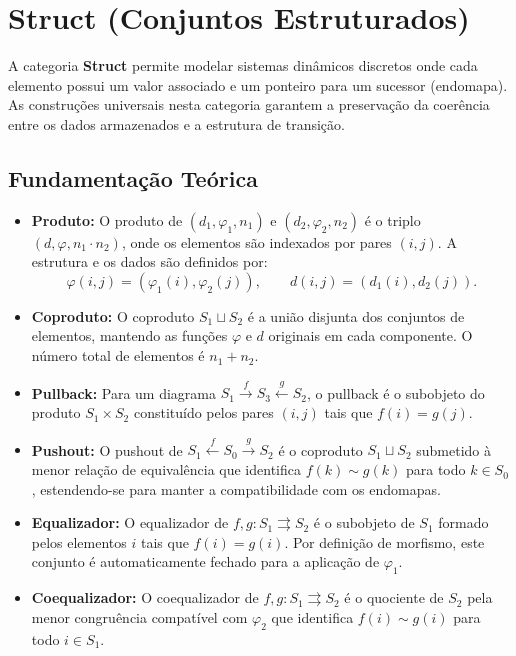 \section{Struct (Conjuntos Estruturados)}
\label{sec:const-struct}

A categoria \textbf{Struct} permite modelar sistemas dinâmicos discretos onde cada elemento possui um valor associado e um ponteiro para um sucessor (endomapa). As construções universais nesta categoria garantem a preservação da coerência entre os dados armazenados e a estrutura de transição.

\subsection{Fundamentação Teórica}

\begin{itemize}
    \item \textbf{Produto:} 
    O produto de $(d_1, \varphi_1, n_1)$ e $(d_2, \varphi_2, n_2)$ é o triplo $(d, \varphi, n_1 \cdot n_2)$, onde os elementos são indexados por pares $(i,j)$. A estrutura e os dados são definidos por:
    \[
        \varphi(i,j) = (\varphi_1(i), \varphi_2(j)), \qquad d(i,j) = (d_1(i), d_2(j)).
    \]

    \item \textbf{Coproduto:} O coproduto $S_1 \sqcup S_2$ é a união disjunta dos conjuntos de elementos, mantendo as funções $\varphi$ e $d$ originais em cada componente. O número total de elementos é $n_1 + n_2$.

    \item \textbf{Pullback:} Para um diagrama $S_1 \xrightarrow{f} S_3 \xleftarrow{g} S_2$, o pullback é o subobjeto do produto $S_1 \times S_2$ constituído pelos pares $(i,j)$ tais que $f(i) = g(j)$.

    \item \textbf{Pushout:} O pushout de $S_1 \xleftarrow{f} S_0 \xrightarrow{g} S_2$ é o coproduto $S_1 \sqcup S_2$ submetido à menor relação de equivalência que identifica $f(k) \sim g(k)$ para todo $k \in S_0$, estendendo-se para manter a compatibilidade com os endomapas.

    \item \textbf{Equalizador:} O equalizador de $f, g: S_1 \rightrightarrows S_2$ é o subobjeto de $S_1$ formado pelos elementos $i$ tais que $f(i) = g(i)$. Por definição de morfismo, este conjunto é automaticamente fechado para a aplicação de $\varphi_1$.

    \item \textbf{Coequalizador:} O coequalizador de $f, g: S_1 \rightrightarrows S_2$ é o quociente de $S_2$ pela menor congruência compatível com $\varphi_2$ que identifica $f(i) \sim g(i)$ para todo $i \in S_1$.
\end{itemize}

